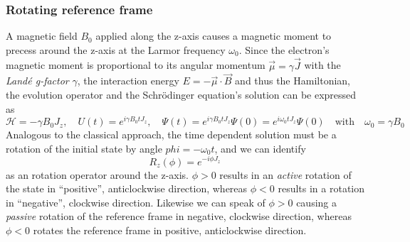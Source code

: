 \documentclass[11.5pt,a4paper]{article}
\begin{document}
\subsubsection{Rotating reference frame}
A magnetic field $B_0$ applied along the z-axis causes a magnetic moment to precess around the z-axis at the Larmor frequency $\omega_0$. Since the electron's magnetic moment is proportional to its angular momentum $\vec{\mu} = \gamma \vec{J}$ with the \emph{Land\'e g-factor} $\gamma$, the interaction energy $E = - \vec{\mu} \cdot \vec{B}$ and thus the Hamiltonian, the evolution operator and the Schr\"odinger equation's solution can be expressed as
\begin{equation}
  \mathcal{H} = - \gamma B_0 J_z, \quad U(t) = e^{i \gamma B_0 t J_z}, \quad \Psi(t) = e^{i \gamma B_0 t J_z} \Psi(0) = e^{i \omega_0 t J_z} \Psi(0) \quad \text{with} \quad \omega_0 = \gamma B_0
\end{equation}
Analogous to the classical approach, the time dependent solution must be a rotation of the initial state by angle $phi = -\omega_0 t$, and we can identify 
\begin{equation}
 R_z(\phi) = e^{-i\phi J_z}
\label{eq-z-rotation}
\end{equation}
as an rotation operator around the z-axis. $\phi > 0$ results in an \emph{active} rotation of the state in ``positive'', anticlockwise direction, whereas $\phi < 0$ results in  a rotation in ``negative'', clockwise direction. Likewise we can speak of $\phi > 0$ causing a \emph{passive} rotation of the reference frame in negative, clockwise direction, whereas $\phi < 0$ rotates the reference frame in positive, anticlockwise direction.
\end{document}
